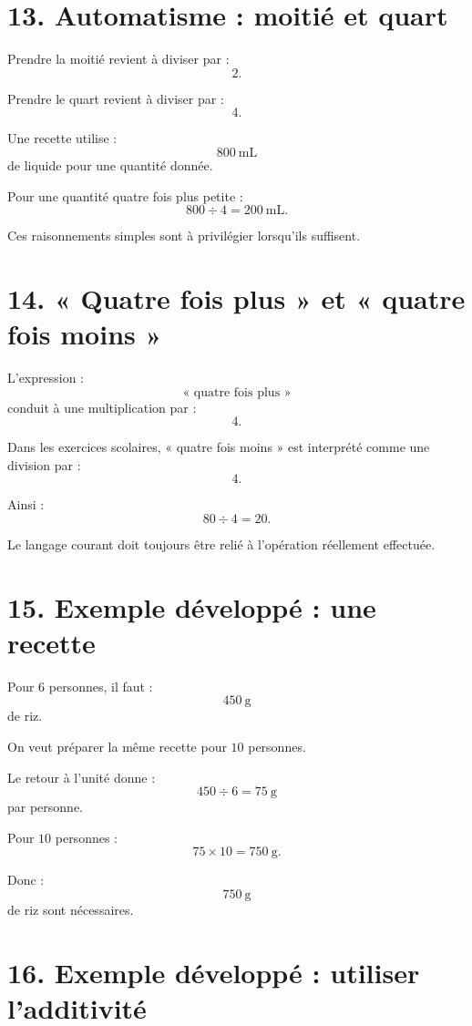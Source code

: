 \section{13. Automatisme : moitié et quart}

Prendre la moitié revient à diviser par :
\[
2.
\]

Prendre le quart revient à diviser par :
\[
4.
\]

\begin{exemple}
Une recette utilise :
\[
800\ \text{mL}
\]
de liquide pour une quantité donnée.

Pour une quantité quatre fois plus petite :
\[
800\div4=200\ \text{mL}.
\]
\end{exemple}

Ces raisonnements simples sont à privilégier lorsqu'ils suffisent.

\section{14. « Quatre fois plus » et « quatre fois moins »}

L'expression :
\[
\text{« quatre fois plus »}
\]
conduit à une multiplication par :
\[
4.
\]

Dans les exercices scolaires, « quatre fois moins » est interprété comme une division par :
\[
4.
\]

Ainsi :
\[
80\div4=20.
\]

Le langage courant doit toujours être relié à l'opération réellement effectuée.

\section{15. Exemple développé : une recette}

Pour $6$ personnes, il faut :
\[
450\ \text{g}
\]
de riz.

On veut préparer la même recette pour $10$ personnes.

Le retour à l'unité donne :
\[
450\div6=75\ \text{g}
\]
par personne.

Pour $10$ personnes :
\[
75\times10=750\ \text{g}.
\]

Donc :
\[
\boxed{750\ \text{g}}
\]
de riz sont nécessaires.

\section{16. Exemple développé : utiliser l'additivité}

